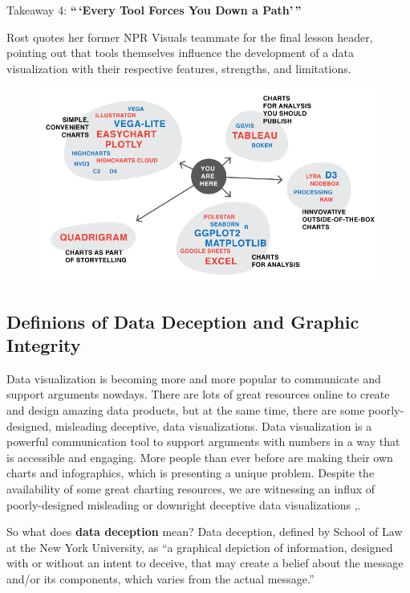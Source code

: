 \documentclass[]{book}
\theoremstyle{definition}
\theoremstyle{definition}
\theoremstyle{definition}
\theoremstyle{remark}
\begin{document}
Takeaway 4: \textbf{``\,`Every Tool Forces You Down a Path'\,''}

Rost quotes her former NPR Visuals teammate for the final lesson header,
pointing out that tools themselves influence the development of a data
visualization with their respective features, strengths, and
limitations.

\begin{figure}
\centering
\includegraphics{images/tools_force_paths.png}
\caption{}
\end{figure}

\subsection{Definions of Data Deception and Graphic
Integrity}\label{definions-of-data-deception-and-graphic-integrity}

Data visualization is becoming more and more popular to communicate and
support arguments nowdays. There are lots of great resources online to
create and design amazing data products, but at the same time, there are
some poorly-designed, misleading deceptive, data visualizations. Data
visualization is a powerful communication tool to support arguments with
numbers in a way that is accessible and engaging. More people than ever
before are making their own charts and infographics, which is presenting
a unique problem. Despite the availability of some great charting
resources, we are witnessing an influx of poorly-designed misleading or
downright deceptive data visualizations
\citep{decept_study},\citep{rose_tint}.

So what does \textbf{data deception} mean? Data deception, defined by
School of Law at the New York University, as ``a graphical depiction of
information, designed with or without an intent to deceive, that may
create a belief about the message and/or its components, which varies
from the actual message.''
\end{document}
